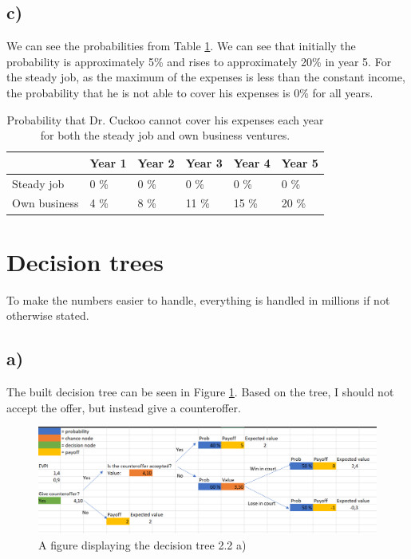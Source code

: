 \documentclass{article}
\begin{document}
\subsection{c)}
	We can see the probabilities from Table \ref{tab:1c}. We can see that initially the probability is approximately 5\% and rises to approximately 20\% in year 5. For the steady job, as the maximum of the expenses is less than the constant income, the probability that he is not able to cover his expenses is 0\% for all years.
	\begin{table}[h]
		\centering
		\caption{Probability that Dr. Cuckoo cannot cover his expenses each year for both the steady job and own business ventures.}
		\label{tab:1c}
		\begin{tabular}{l|l|l|l|l|l|}
			\cline{2-6}
			& Year 1 & Year 2 & Year 3 & Year 4 & Year 5 \\ \hline
			\multicolumn{1}{|l|}{Steady job}   & 0 \%   & 0 \%   & 0 \%   & 0 \%   & 0 \%   \\ \hline
			\multicolumn{1}{|l|}{Own business} & 4 \%   & 8 \%   & 11 \%  & 15 \%  & 20 \%  \\ \hline
		\end{tabular}
	\end{table}
\section{Decision trees}
	To make the numbers easier to handle, everything is handled in millions if not otherwise stated.
\subsection{a)}
	The built decision tree can be seen in Figure \ref{fig:2a}. Based on the tree, I should not accept the offer, but instead give a counteroffer.
	\begin{figure}[H]
		\includegraphics[width=\textwidth]{2a.png}
		\caption{A figure displaying the decision tree 2.2 a)}
		\label{fig:2a}
	\end{figure}
\end{document}
